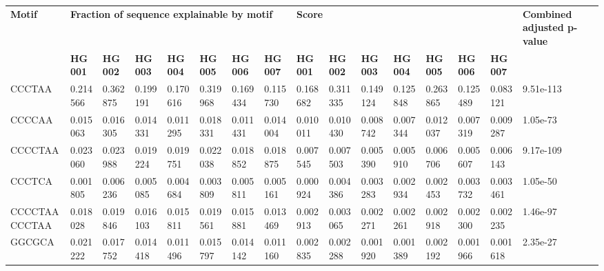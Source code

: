 \begin{samepage} \begin{table}[h!] \small \begin{tabular}{llllllllllllllll}
\hline
\textbf{Motif} & \multicolumn{7}{l}{\textbf{Fraction of sequence explainable by motif}}                                               & \multicolumn{7}{l}{\textbf{Score}}                                                                                   & \textbf{Combined adjusted p-value} \\
\textbf{}      & \textbf{HG001} & \textbf{HG002} & \textbf{HG003} & \textbf{HG004} & \textbf{HG005} & \textbf{HG006} & \textbf{HG007} & \textbf{HG001} & \textbf{HG002} & \textbf{HG003} & \textbf{HG004} & \textbf{HG005} & \textbf{HG006} & \textbf{HG007} & \textbf{}                          \\
\hline
CCCTAA         & 0.214566       & 0.362875       & 0.199191       & 0.170616       & 0.319968       & 0.169434       & 0.115730       & 0.168682       & 0.311335       & 0.149124       & 0.125848       & 0.263865       & 0.125489       & 0.083121       & 9.51e-113                          \\
CCCCAA         & 0.015063       & 0.016305       & 0.014331       & 0.011295       & 0.018331       & 0.011431       & 0.014004       & 0.010011       & 0.010430       & 0.008742       & 0.007344       & 0.012037       & 0.007319       & 0.009287       & 1.05e-73                           \\
CCCCTAA        & 0.023060       & 0.023988       & 0.019224       & 0.019751       & 0.022038       & 0.018852       & 0.018875       & 0.007545       & 0.007503       & 0.005390       & 0.005910       & 0.006706       & 0.005607       & 0.006143       & 9.17e-109                          \\
CCCTCA         & 0.001805       & 0.006236       & 0.005085       & 0.004684       & 0.003809       & 0.005811       & 0.005161       & 0.000924       & 0.004386       & 0.003283       & 0.002934       & 0.002453       & 0.003732       & 0.003461       & 1.05e-50                           \\
CCCCTAACCCTAA  & 0.018028       & 0.019846       & 0.016103       & 0.015811       & 0.019561       & 0.015881       & 0.013469       & 0.002913       & 0.003065       & 0.002271       & 0.002261       & 0.002918       & 0.002300       & 0.002235       & 1.46e-97                           \\
GGCGCA         & 0.021222       & 0.017752       & 0.014418       & 0.011496       & 0.015797       & 0.014142       & 0.011160       & 0.002835       & 0.002288       & 0.001920       & 0.001389       & 0.002192       & 0.001966       & 0.001618       & 2.35e-27                           \\

\end{tabular}
\end{table}
\end{samepage}

